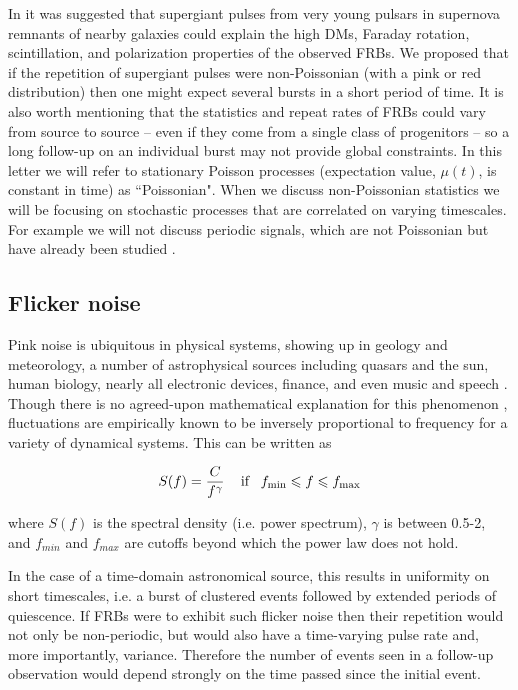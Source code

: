 \documentclass[useAMS,usenatbib]{mn2e}
\begin{document}
In \cite{2015arXiv150505535C} it was 
suggested that supergiant pulses from very young pulsars in supernova 
remnants of nearby galaxies could explain the high DMs, Faraday rotation, 
scintillation, and polarization properties of the observed FRBs. We  
proposed that if the repetition of supergiant pulses were non-Poissonian 
(with a pink or red distribution) 
then one might expect several bursts in a short period of time. 
It is also worth mentioning that the statistics and repeat rates of FRBs 
could vary from source to source -- even if 
they come from a single class of progenitors -- so a long follow-up on an individual burst 
may not provide global constraints.
In this 
letter we will refer to stationary Poisson processes (expectation value, $\mu(t)$, is constant in time)
as ``Poissonian". When we discuss non-Poissonian statistics we will be
focusing on stochastic processes that are correlated on varying timescales. For
example we will not discuss periodic signals, which are not Poissonian but 
have already been studied \citep{2015MNRAS.454..457P}.


\subsection{Flicker noise}

Pink noise is ubiquitous in physical systems, showing up in 
geology and meteorology, a number 
of astrophysical sources including quasars and the sun, 
human biology, nearly all electronic devices, finance, 
and even music and speech
\citep{1978ComAp...7..103P, 1975Natur.258..317V}.
Though there is no agreed-upon
mathematical explanation for this phenomenon
 \citep{2002physics...4033M}, fluctuations 
are empirically known to be inversely proportional to frequency 
for a variety of dynamical systems. This can be written as 

\begin{equation}
S(f) = \frac{C}{f^\gamma} \,\,\,\,\,\ \textup{if} \,\,\,\,\, f_{\rm{min}} \le f \le f_{\rm{max}}
\end{equation}

\noindent where $S(f)$ is the spectral density (i.e. power spectrum), $\gamma$ is 
between 0.5-2,
and $f_{min}$ and $f_{max}$ are cutoffs beyond which the power law 
does not hold.

In the case of a time-domain astronomical 
source, this results in uniformity on short timescales, i.e. a burst of 
clustered events followed by extended periods of quiescence. 
If FRBs were to exhibit such flicker noise then their repetition would 
not only be non-periodic, but would also have a time-varying 
pulse rate and, more importantly, variance. Therefore the number of events
seen in a follow-up observation would depend strongly on 
the time passed since the initial event.
\end{document}
